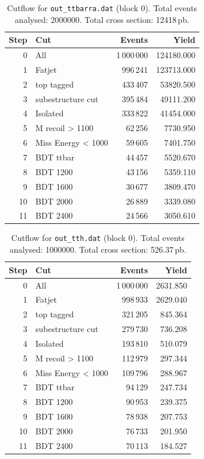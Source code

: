 \documentclass{article}
\begin{document}
\begin{table}[H]
\centering
\begin{tabular}{r l r r}
\toprule
Step & Cut & Events & Yield \\
\midrule
0 & All & 1\,000\,000 & 124180.000 \\
1 & Fatjet & 996\,241 & 123713.000 \\
2 & top tagged & 433\,407 & 53820.500 \\
3 & subestructure cut & 395\,484 & 49111.200 \\
4 & Isolated & 333\,822 & 41454.000 \\
5 & M recoil > 1100 & 62\,256 & 7730.950 \\
6 & Miss Energy < 1000 & 59\,605 & 7401.750 \\
7 & BDT ttbar & 44\,457 & 5520.670 \\
8 & BDT 1200 & 43\,156 & 5359.110 \\
9 & BDT 1600 & 30\,677 & 3809.470 \\
10 & BDT 2000 & 26\,889 & 3339.080 \\
11 & BDT 2400 & 24\,566 & 3050.610 \\
\bottomrule
\end{tabular}
\caption{Cutflow for \texttt{out\_ttbarra.dat} (block 0). Total events analysed: 2000000. Total cross section: 12418\,pb.}
\label{tab:cutflow-out-ttbarra-dat}
\end{table}

\begin{table}[H]
\centering
\begin{tabular}{r l r r}
\toprule
Step & Cut & Events & Yield \\
\midrule
0 & All & 1\,000\,000 & 2631.850 \\
1 & Fatjet & 998\,933 & 2629.040 \\
2 & top tagged & 321\,205 & 845.364 \\
3 & subestructure cut & 279\,730 & 736.208 \\
4 & Isolated & 193\,810 & 510.079 \\
5 & M recoil > 1100 & 112\,979 & 297.344 \\
6 & Miss Energy < 1000 & 109\,796 & 288.967 \\
7 & BDT ttbar & 94\,129 & 247.734 \\
8 & BDT 1200 & 90\,953 & 239.375 \\
9 & BDT 1600 & 78\,938 & 207.753 \\
10 & BDT 2000 & 76\,733 & 201.950 \\
11 & BDT 2400 & 70\,113 & 184.527 \\
\bottomrule
\end{tabular}
\caption{Cutflow for \texttt{out\_tth.dat} (block 0). Total events analysed: 1000000. Total cross section: 526.37\,pb.}
\label{tab:cutflow-out-tth-dat}
\end{table}
\end{document}
